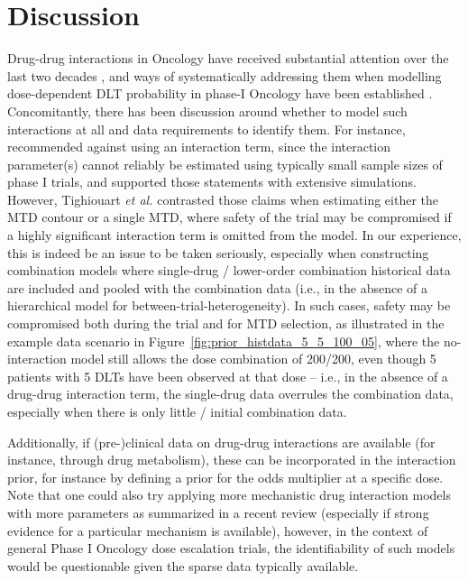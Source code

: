 \documentclass[AMA,STIX1COL]{WileyNJD-v2}
\newcommand{\revision}[1]{#1}
\begin{document}
\section{Discussion}\label{sec:discussion}
Drug-drug interactions in Oncology have received substantial attention over the last two decades \cite{Beijnen2004}, and ways of systematically addressing them when modelling dose-dependent DLT probability in phase-I Oncology have been established \cite{Thall2003}. \revision{Concomitantly, there has been discussion around whether to model such interactions at all and data requirements to identify them. For instance, \cite{Wang2005, Riviere2015} recommended against using an interaction term, since the interaction parameter(s) cannot reliably be estimated using typically small sample sizes of phase I trials, and \cite{Mozgunov2021} supported those statements with extensive simulations. However, Tighiouart \emph{et al.}\cite{Tighiouart2022} contrasted those claims when estimating either the MTD contour or a single MTD, where safety of the trial may be compromised if a highly significant interaction term is omitted from the model. In our experience, this is indeed be an issue to be taken seriously, especially when constructing combination models where single-drug / lower-order combination historical data are included and pooled with the combination data (i.e., in the absence of a hierarchical model for between-trial-heterogeneity). In such cases, safety may be compromised both during the trial and for MTD selection, as illustrated in the example data scenario in Figure~\ref{fig:prior_histdata_5_5_100_05}, where the no-interaction model still allows the dose combination of 200/200, even though 5 patients with 5 DLTs have been observed at that dose -- i.e., in the absence of a drug-drug interaction term, the single-drug data overrules the combination data, especially when there is only little / initial combination data.} 

Additionally, if (pre-)clinical data on drug-drug interactions are available (for instance, through drug metabolism), these can be incorporated in the interaction prior, for instance by defining a prior for the odds multiplier at a specific dose. Note that one could also try applying more mechanistic drug interaction models with more parameters as summarized in a recent review\cite{Meyer2020} (especially if strong evidence for a particular mechanism is available), however, in the context of general Phase I Oncology dose escalation trials, the identifiability of such models would be questionable given the sparse data typically available.
\end{document}
